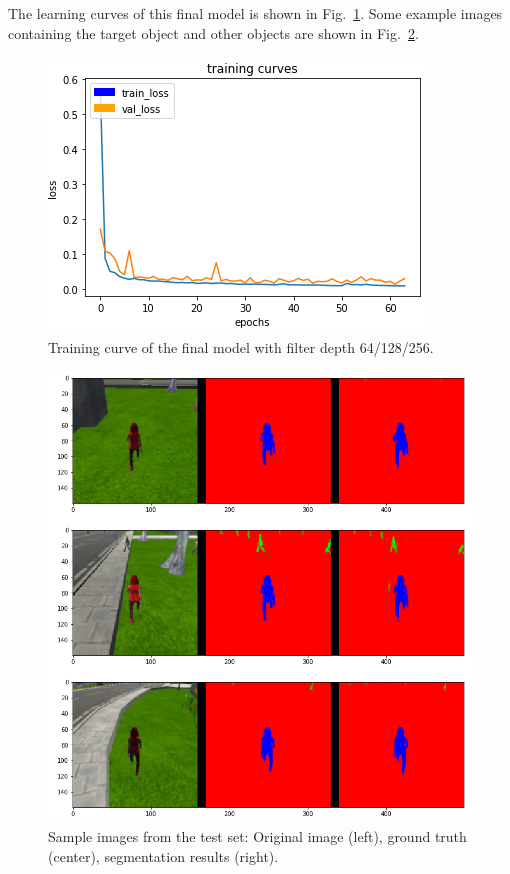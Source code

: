 \documentclass[twoside, twocolumn]{article}
\newcommand{\figref}[1]{Fig.~\ref{fig:#1}}
\begin{document}
The learning curves of this final model is shown in \figref{training_curve}. Some
example images containing the target object and other objects are shown in
\figref{segmentation_examples}.

\begin{figure}[ht]
\centering
\includegraphics[width=\columnwidth]{fig/training_curve.png}
\caption{\label{fig:training_curve} Training curve of the final model with filter depth 64/128/256.}
\end{figure}

\begin{figure}[ht]
\centering
\includegraphics[width=\columnwidth]{fig/segmentation_examples.png}
\caption{\label{fig:segmentation_examples} Sample images from the test set:
Original image (left), ground truth (center), segmentation results (right).}
\end{figure}
\end{document}
